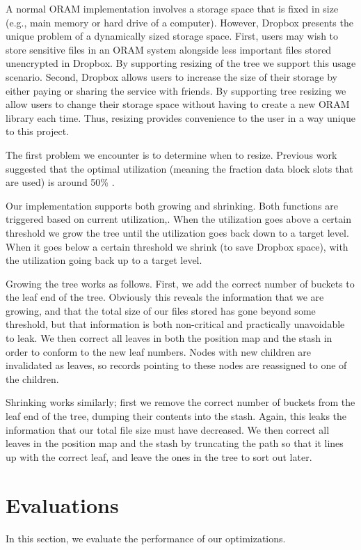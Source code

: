 \documentclass{article}
\begin{document}
\begin{multicols}{2}
A normal ORAM implementation involves a storage space that is fixed in size (e.g., main memory or hard drive of a computer). However, Dropbox presents the unique problem of a dynamically sized storage space. First, users may wish to store sensitive files in an ORAM system alongside less important files stored unencrypted in Dropbox. By supporting resizing of the tree we support this usage scenario. Second, Dropbox allows users to increase the size of their storage by either paying or sharing the service with friends. By supporting tree resizing we allow users to change their storage space without having to create a new ORAM library each time. Thus, resizing provides convenience to the user in a way unique to this project.
\par The first problem we encounter is to determine when to resize. Previous work suggested that the optimal utilization (meaning the fraction data block slots that are used) is around 50\% \cite{Ren}.
\par Our implementation supports both growing and shrinking. Both functions are triggered based on current utilization,. When the utilization goes above a certain threshold we grow the tree until the utilization goes back down to a target level. When it goes below a certain threshold we shrink (to save Dropbox space), with the utilization going back up to a target level.
\par Growing the tree works as follows. First, we add the correct number of buckets to the leaf end of the tree. Obviously this reveals the information that we are growing, and that the total size of our files stored has gone beyond some threshold, but that information is both non-critical and practically unavoidable to leak. We then correct all leaves in both the position map and the stash in order to conform to the new leaf numbers. Nodes with new children are invalidated as leaves, so records pointing to these nodes are reassigned to one of the children.
\par Shrinking works similarly; first we remove the correct number of buckets from the leaf end of the tree, dumping their contents into the stash. Again, this leaks the information that our total file size must have decreased. We then correct all leaves in the position map and the stash by truncating the path so that it lines up with the correct leaf, and leave the ones in the tree to sort out later.


\section{Evaluations}
In this section, we evaluate the performance of our optimizations. 


\end{multicols}
\end{document}
